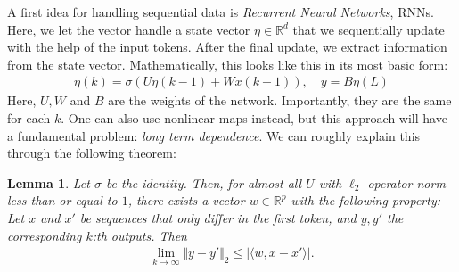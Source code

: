 \documentclass{article}
\newcommand{\sprod}[1]{\langle #1 \rangle}
\newcommand{\R}{\mathbb{R}}
\newtheorem{lemma}{Lemma}
\newcommand{\abs}[1]{\vert #1 \vert}
\newcommand{\norm}[1]{\Vert #1 \Vert}
\begin{document}
A first idea for handling sequential data is \emph{Recurrent Neural Networks}, RNNs. Here, we let the vector handle a state vector $\eta \in \R^d$ that we sequentially update with the help of the input tokens. After the final update, we extract information from the state vector. Mathematically, this looks like this in its most basic form:
\begin{align*}
    \eta(k) = \sigma(U\eta(k-1) + Wx(k-1)), \quad y = B\eta(L)
\end{align*}
Here, $U,W$ and $B$ are the weights of the network. Importantly, they are the same for each $k$. One can also use nonlinear maps instead, but this approach will have a fundamental problem: \emph{long term dependence}. We can roughly explain this through the following theorem:
\begin{lemma}
    Let $\sigma$ be the identity. Then, for almost all $U$ with $\ell_2$-operator norm less than or equal to $1$, there exists a vector $w\in \R^p$ with the following property: Let $x$ and $x'$ be sequences that only differ in the first token, and $y, y'$ the corresponding $k$:th outputs. Then
    \begin{align*}
        \lim_{k\to \infty} \norm{y - y'}_2 \leq \abs{\sprod{w,x-x'}}.
    \end{align*}
\end{lemma}
\end{document}
